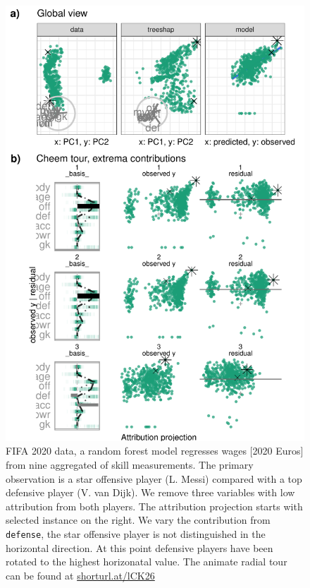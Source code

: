 \documentclass[
]{article}
\begin{document}
\begin{figure}

{\centering \includegraphics[width=1\linewidth]{./figures/case_fifa} 

}

\caption{FIFA 2020 data, a random forest model regresses wages {[}2020 Euros{]} from nine aggregated of skill measurements. The primary observation is a star offensive player (L. Messi) compared with a top defensive player (V. van Dijk). We remove three variables with low attribution from both players. The attribution projection starts with selected instance on the right. We vary the contribution from \texttt{defense}, the star offensive player is not distinguished in the horizontal direction. At this point defensive players have been rotated to the highest horizonatal value. The animate radial tour can be found at \href{https://github.com/nspyrison/cheem_paper/blob/main/figures/case_fifa.mp4}{shorturl.at/lCK26}}\label{fig:casefifa}
\end{figure}
\end{document}
